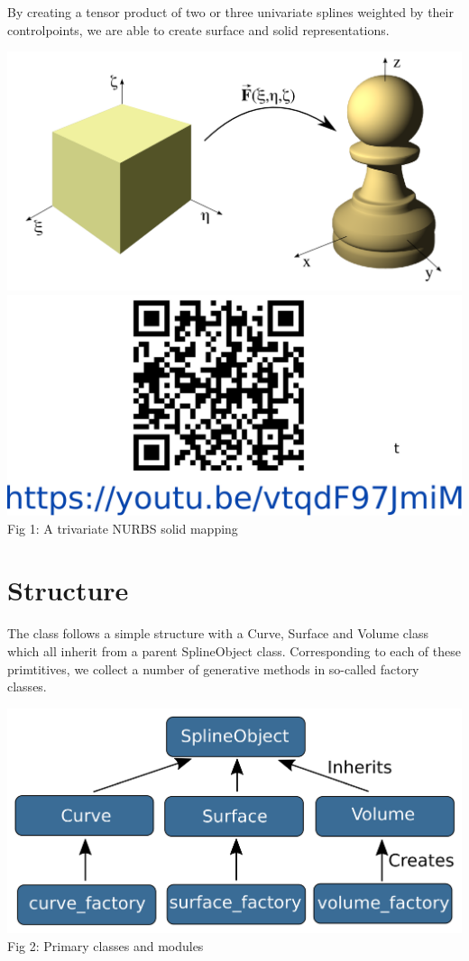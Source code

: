 \documentclass[landscape]{sintefposter}
\begin{document}
\begin{multicols}{3}
By creating a tensor product of two or three univariate splines weighted by their controlpoints, we are able to create surface and solid representations.

\begin{center}
  \includegraphics[width=16cm]{pawn-mapping}
  \includegraphics[height=6.5cm]{MappingQR} \\
  \normalsize{Fig 1: A trivariate NURBS solid mapping}
\end{center}

\vspace{4cm}
\section{Structure}

The class follows a simple structure with a Curve, Surface and Volume class which all inherit from a parent SplineObject class. Corresponding to each of these primtitives, we collect a number of generative methods in so-called factory classes.

\begin{center}
  \includegraphics[width=0.7\linewidth]{classstructure} \\
  \normalsize{Fig 2: Primary classes and modules}
\end{center}


\end{multicols}
\end{document}
